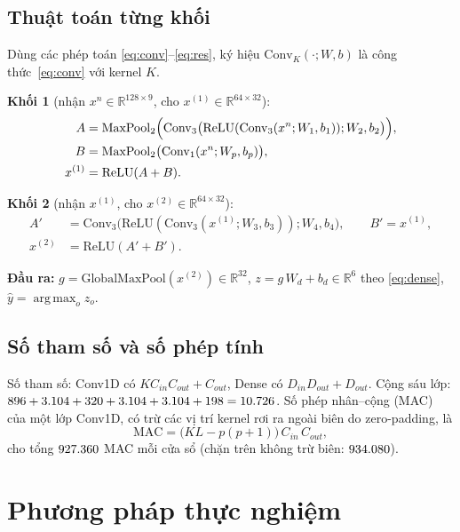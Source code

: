\documentclass[12pt,a4paper]{article}
\DeclareMathOperator*{\argmax}{arg\,max}
\begin{document}
\subsection{Thuật toán từng khối}
Dùng các phép toán \eqref{eq:conv}--\eqref{eq:res}, ký hiệu $\mathrm{Conv}_K(\cdot;W,b)$ là công thức~\eqref{eq:conv} với kernel $K$.

\textbf{Khối 1} (nhận $x^{n}\in\mathbb{R}^{128\times9}$, cho $x^{(1)}\in\mathbb{R}^{64\times32}$):
\begin{align}
A&=\mathrm{MaxPool}_2\Bigl(\mathrm{Conv}_3\bigl(\mathrm{ReLU}(\mathrm{Conv}_3(x^{n};W_1,b_1));W_2,b_2\bigr)\Bigr),\label{eq:A1}\\
B&=\mathrm{MaxPool}_2\bigl(\mathrm{Conv}_1(x^{n};W_p,b_p)\bigr),\label{eq:B1}\\
x^{(1)}&=\mathrm{ReLU}(A+B).\label{eq:x1}
\end{align}

\textbf{Khối 2} (nhận $x^{(1)}$, cho $x^{(2)}\in\mathbb{R}^{64\times32}$):
\begin{align}
A'&=\mathrm{Conv}_3\bigl(\mathrm{ReLU}(\mathrm{Conv}_3(x^{(1)};W_3,b_3));W_4,b_4\bigr),\qquad B'=x^{(1)},\label{eq:A2}\\
x^{(2)}&=\mathrm{ReLU}(A'+B').\label{eq:x2}
\end{align}

\textbf{Đầu ra:} $g=\mathrm{GlobalMaxPool}(x^{(2)})\in\mathbb{R}^{32}$, $z=g\,W_d+b_d\in\mathbb{R}^{6}$ theo \eqref{eq:dense}, $\hat y=\argmax_o z_o$.

\subsection{Số tham số và số phép tính}
Số tham số: Conv1D có $KC_{in}C_{out}+C_{out}$, Dense có $D_{in}D_{out}+D_{out}$. Cộng sáu lớp: $896+3.104+320+3.104+3.104+198=\mbox{10.726}$. Số phép nhân--cộng (MAC) của một lớp Conv1D, có trừ các vị trí kernel rơi ra ngoài biên do zero-padding, là
\begin{equation}
\mathrm{MAC}=\bigl(KL-p(p+1)\bigr)\,C_{in}\,C_{out},
\end{equation}
cho tổng $\mbox{927.360}$ MAC mỗi cửa sổ (chặn trên không trừ biên: $\mbox{934.080}$).

\section{Phương pháp thực nghiệm}
\end{document}

